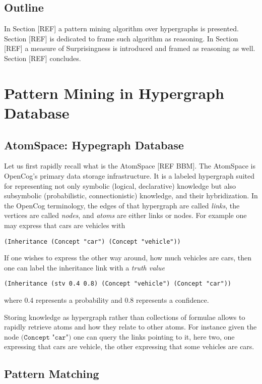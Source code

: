 \documentclass[runningheads]{llncs}
\begin{document}
\subsection{Outline}

In Section [REF] a pattern mining algorithm over hypergraphs is
presented. Section [REF] is dedicated to frame such algorithm as
reasoning. In Section [REF] a measure of Surprisingness is introduced
and framed as reasoning as well. Section [REF] concludes.

\section{Pattern Mining in Hypergraph Database}

\subsection{AtomSpace: Hypegraph Database}

Let us first rapidly recall what is the AtomSpace [REF BBM]. The
AtomSpace is OpenCog's primary data storage infrastructure. It is a
labeled hypergraph suited for representing not only symbolic (logical,
declarative) knowledge but also subsymbolic (probabilistic,
connectionistic) knowledge, and their hybridization. In the OpenCog
terminology, the edges of that hypergraph are called \emph{links}, the
vertices are called \emph{nodes}, and \emph{atoms} are either links or
nodes.  For example one may express that cars are vehicles with
\begin{verbatim}
(Inheritance (Concept "car") (Concept "vehicle"))
\end{verbatim}
If one wishes to express the other way around, how much vehicles are
cars, then one can label the inheritance link with a \emph{truth
  value}
\begin{verbatim}
(Inheritance (stv 0.4 0.8) (Concept "vehicle") (Concept "car"))
\end{verbatim}
where 0.4 represents a probability and 0.8 represents a confidence.

Storing knowledge as hypergraph rather than collections of formulae
allows to rapidly retrieve atoms and how they relate to other
atoms. For instance given the node $\texttt{(Concept "car")}$ one can
query the links pointing to it, here two, one expressing that cars are
vehicle, the other expressing that some vehicles are cars.

\subsection{Pattern Matching}
\end{document}
